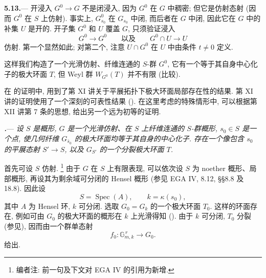 \par\medskip\noindent
\textbf{5.13.}---
开浸入 \(G^0\to G\) 不是闭浸入, 因为 \(G^0\) 在 \(G\) 中稠密; 但它是仿射态射 \textup{(因而 \(G^0\) 在 \(S\) 上仿射)}. 事实上, \(G^0_{s_0}\) 在 \(G_{s_0}\) 中闭, 而后者在 \(G\) 中闭, 因此它在 \(G\) 中的补集 \(U\) 是开的. 开子集 \(G^0\) 和 \(U\) 覆盖 \(G\), 只须验证浸入
\[
  G^0\longrightarrow G^0
  \qquad\text{以及}\qquad
  G^0\cap U\longrightarrow U
\]
仿射. 第一个显然如此; 对第二个, 注意 \(U\cap G^0\) 在 \(U\) 中由条件 \(t\ne0\) 定义.

这样我们构造了一个光滑仿射、纤维连通的 \(S\)-群 \(G^0\), 它有一个等于其自身中心化子的极大环面 \(T\), 但 Weyl 群 \(W_{G^0}(T)\) 并不有限 \textup{(比较)}.

在 的证明中, 用到了第 XI 讲关于平展拓扑下极大环面局部存在性的结果. 第 XI 讲的证明使用了一个深刻的可表性结果 \textup{()}. 在这里考虑的特殊情形中, 可以根据第 XII 讲第 7 条的思想, 给出另一个远为初等的证明.

\par\medskip\noindent
{}\textbf{\textit{.}}---
\textit{设 \(S\) 是概形, \(G\) 是一个光滑仿射、在 \(S\) 上纤维连通的 \(S\)-群概形, \(s_0\in S\) 是一个点, 使几何纤维 \(G_{\bar s_0}\) 的极大环面均等于其自身的中心化子. 存在一个像包含 \(s_0\) 的平展态射 \(S'\to S\), 以及 \(G_{S'}\) 的一个分裂极大环面 \(T\).}

首先可设 \(S\) 仿射.
\footnote{编者注: 前一句及下文对 EGA IV 的引用为新增.}
由于 \(G\) 在 \(S\) 上有限表现, 可以依次设 \(S\) 为 noether 概形、局部概形, 再设其为剩余域可分闭的 Hensel 概形 \textup{(参见 EGA IV, 8.12, \S\S 8.8 及 18.8)}. 因此设
\[
  S=\operatorname{Spec}(A),
  \qquad
  k=\kappa(s_0),
\]
其中 \(A\) 为 Hensel 环, \(k\) 可分闭. 选取 \(G_0=G_k\) 的一个极大环面 \(T_0\). 这样的环面存在, 例如可由 \(G_0\) 的极大环面的概形在 \(k\) 上光滑得知 \textup{()}. 由于 \(k\) 可分闭, \(T_0\) 分裂 \textup{(参见)}, 因而由一个群单态射
\[
  f_0\colon \mathbb G_{m,k}^{\,r}\longrightarrow G_0.
\]
给出.

